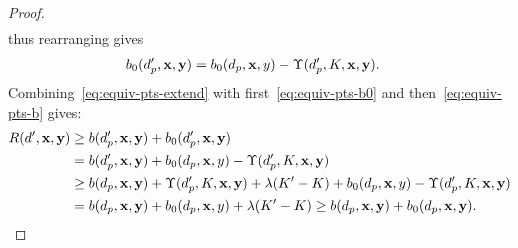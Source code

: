 \begin{arxiv}
\begin{proof}
\begin{align}
\end{align}
thus rearranging gives
\begin{align}
b_0(d_p', \mathbf{x}, \mathbf{y}) &= b_0(d_p, \mathbf{x}, y) - \Upsilon(d_p', K, \mathbf{x}, \mathbf{y}).
\label{eq:equiv-pts-b0}
\end{align}
Combining~\eqref{eq:equiv-pts-extend} with first~\eqref{eq:equiv-pts-b0}
and then~\eqref{eq:equiv-pts-b} gives:
\begin{align}
R({d}', \mathbf{x}, \mathbf{y}) &\ge b(d_p', \mathbf{x}, \mathbf{y}) + b_0(d_p', \mathbf{x}, \mathbf{y}) \nonumber \\
&= b(d_p', \mathbf{x}, \mathbf{y}) + b_0(d_p, \mathbf{x}, y) - \Upsilon(d_p', K, \mathbf{x}, \mathbf{y}) \nonumber \\
&\ge b(d_p, \mathbf{x}, \mathbf{y}) + \Upsilon(d_p', K, \mathbf{x}, \mathbf{y}) + {\lambda} (K' - K) + b_0(d_p, \mathbf{x}, y) - \Upsilon(d_p', K, \mathbf{x}, \mathbf{y}) \nonumber \\
&= b(d_p, \mathbf{x}, \mathbf{y}) + b_0(d_p, \mathbf{x}, y) + {\lambda} (K' - K)
\ge b(d_p, \mathbf{x}, \mathbf{y}) + b_0(d_p, \mathbf{x}, \mathbf{y}).
\end{align}
\end{proof}
\end{arxiv}
